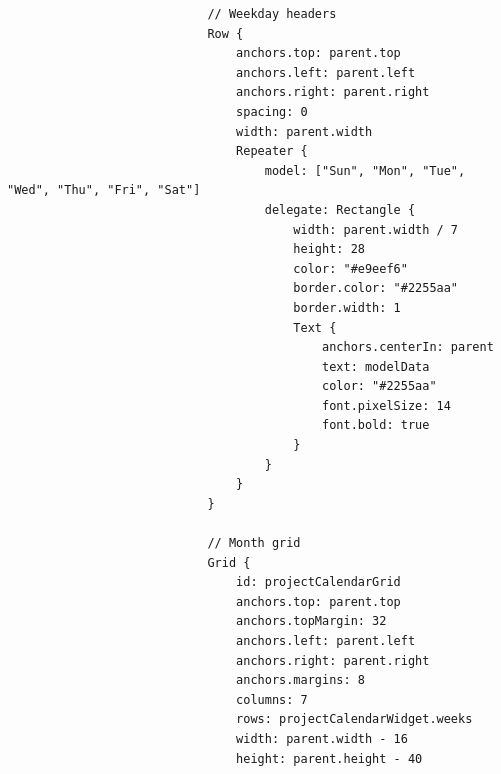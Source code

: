 \documentclass{report}
\begin{document}
\begin{lstlisting}
                            // Weekday headers
                            Row {
                                anchors.top: parent.top
                                anchors.left: parent.left
                                anchors.right: parent.right
                                spacing: 0
                                width: parent.width
                                Repeater {
                                    model: ["Sun", "Mon", "Tue", "Wed", "Thu", "Fri", "Sat"]
                                    delegate: Rectangle {
                                        width: parent.width / 7
                                        height: 28
                                        color: "#e9eef6"
                                        border.color: "#2255aa"
                                        border.width: 1
                                        Text {
                                            anchors.centerIn: parent
                                            text: modelData
                                            color: "#2255aa"
                                            font.pixelSize: 14
                                            font.bold: true
                                        }
                                    }
                                }
                            }

                            // Month grid
                            Grid {
                                id: projectCalendarGrid
                                anchors.top: parent.top
                                anchors.topMargin: 32
                                anchors.left: parent.left
                                anchors.right: parent.right
                                anchors.margins: 8
                                columns: 7
                                rows: projectCalendarWidget.weeks
                                width: parent.width - 16
                                height: parent.height - 40
                            

\end{lstlisting}
\end{document}
